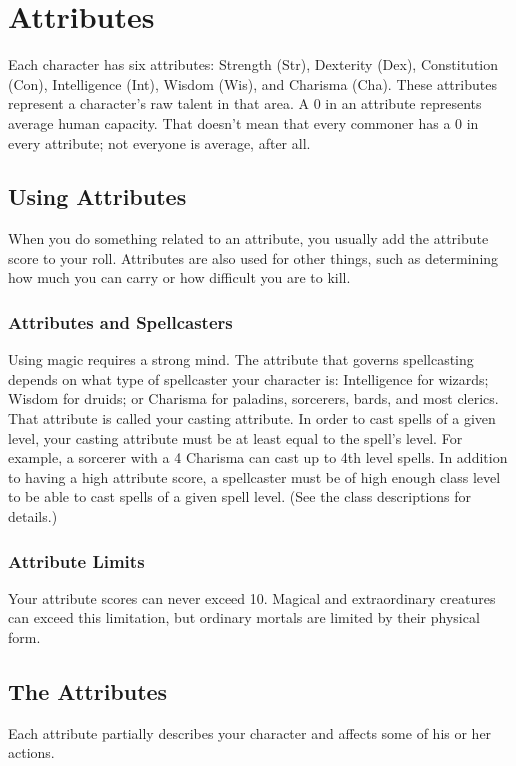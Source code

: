 \chapter{Attributes}
Each character has six attributes: Strength (Str), Dexterity (Dex), Constitution (Con), Intelligence (Int), Wisdom (Wis), and Charisma (Cha). These attributes represent a character's raw talent in that area. A 0 in an attribute represents average human capacity. That doesn't mean that every commoner has a 0 in every attribute; not everyone is average, after all.

\section{Using Attributes}
When you do something related to an attribute, you usually add the attribute score to your roll. Attributes are also used for other things, such as determining how much you can carry or how difficult you are to kill. 

\subsection{Attributes and Spellcasters}
Using magic requires a strong mind. The attribute that governs spellcasting depends on what type of spellcaster your character is: Intelligence for wizards; Wisdom for druids; or Charisma for paladins, sorcerers, bards, and most clerics. That attribute is called your casting attribute. In order to cast spells of a given level, your casting attribute must be at least equal to the spell's level. For example, a sorcerer with a 4 Charisma can cast up to 4th level spells. In addition to having a high attribute score, a spellcaster must be of high enough class level to be able to cast spells of a given spell level. (See the class descriptions for details.)

\subsection{Attribute Limits}
Your attribute scores can never exceed 10. Magical and extraordinary creatures can exceed this limitation, but ordinary mortals are limited by their physical form.

\section{The Attributes}
Each attribute partially describes your character and affects some of his or her actions.

